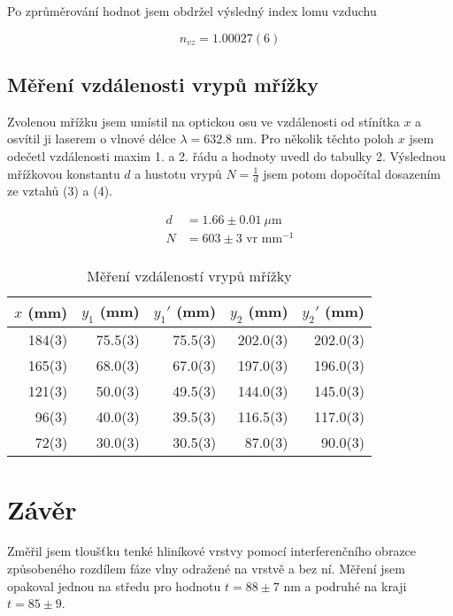\documentclass[a4paper,11pt]{article}
\begin{document}
Po zprůměrování hodnot jsem obdržel výsledný index lomu vzduchu

\begin{equation}
n_{vz} = 1.00027(6)
\end{equation}

\newpage 

\subsection{Měření vzdálenosti vrypů mřížky}

Zvolenou mřížku jsem umístil na optickou osu ve vzdálenosti od stínítka $ x $ a osvítil ji laserem o vlnové délce $ \lambda = 632.8 $ nm. Pro několik těchto poloh $ x $ jsem odečetl vzdálenosti maxim 1. a 2. řádu a hodnoty uvedl do tabulky 2. Výslednou mřížkovou konstantu $ d $ a hustotu vrypů $ N = \frac{1}{d} $ jsem potom dopočítal dosazením ze vztahů (3) a (4).

\begin{align*}
    d &= 1.66 \pm 0.01 \ \mu \text{m} \\
    N &= 603 \pm 3  \text{ vr mm}^{-1}\\
\end{align*}

\begin{table}[htpb]
    \centering
    \begin{tabular}{r r r r r }
        $ x $ (mm) & $ y_1 $ (mm) & $ y_1' $ (mm) & $ y_2 $ (mm) & $ y_2' $ (mm) \\ \hline \hline
        184(3) & 75.5(3) & 75.5(3) & 202.0(3) & 202.0(3) \\
        165(3) & 68.0(3) & 67.0(3) & 197.0(3) & 196.0(3)  \\
        121(3) & 50.0(3) & 49.5(3) & 144.0(3) & 145.0(3) \\
         96(3) & 40.0(3) & 39.5(3) & 116.5(3) & 117.0(3)  \\
         72(3) & 30.0(3) & 30.5(3) &  87.0(3) &  90.0(3) \\ \hline
    \end{tabular}
    \caption{Měření vzdáleností vrypů mřížky}
\end{table}

\section{Závěr}

Změřil jsem tloušťku tenké hliníkové vrstvy pomocí interferenčního obrazce způsobeného rozdílem fáze vlny odražené na vrstvě a bez ní. Měření jsem opakoval jednou na středu pro hodnotu $ t = 88 \pm 7 $ nm a podruhé na kraji $ t = 85 \pm 9 $.
\end{document}
